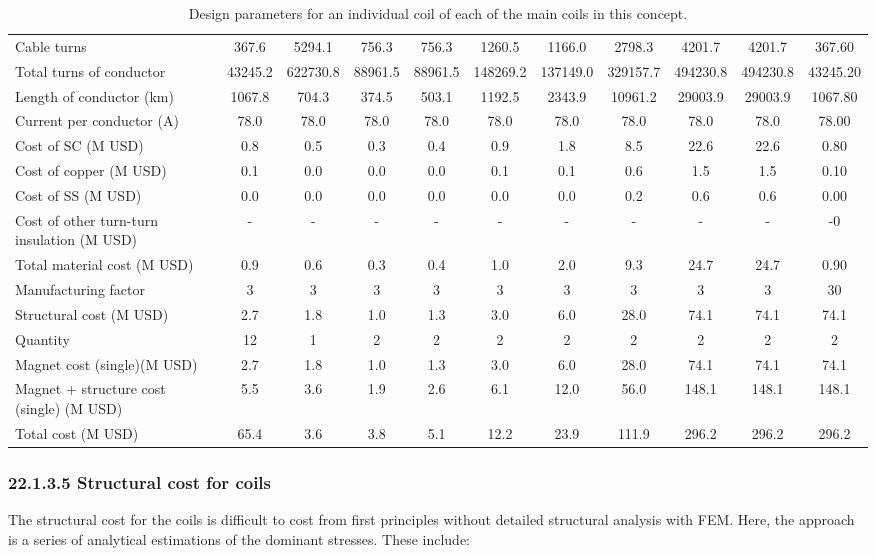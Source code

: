 \begin{table}[h]
{\begin{tabular}{lcccccccccc}
Cable turns & 367.6 & 5294.1 & 756.3 & 756.3 & 1260.5 & 1166.0 & 2798.3 & 4201.7 & 4201.7 & 367.60 \\
Total turns of conductor & 43245.2 & 622730.8 & 88961.5 & 88961.5 & 148269.2 & 137149.0 & 329157.7 & 494230.8 & 494230.8 & 43245.20 \\
Length of conductor (km) & 1067.8 & 704.3 & 374.5 & 503.1 & 1192.5 & 2343.9 & 10961.2 & 29003.9 & 29003.9 & 1067.80 \\
Current per conductor (A) & 78.0 & 78.0 & 78.0 & 78.0 & 78.0 & 78.0 & 78.0 & 78.0 & 78.0 & 78.00 \\
\hline
Cost of SC (M USD) & 0.8 & 0.5 & 0.3 & 0.4 & 0.9 & 1.8 & 8.5 & 22.6 & 22.6 & 0.80 \\
Cost of copper (M USD) & 0.1 & 0.0 & 0.0 & 0.0 & 0.1 & 0.1 & 0.6 & 1.5 & 1.5 & 0.10 \\
Cost of SS (M USD) & 0.0 & 0.0 & 0.0 & 0.0 & 0.0 & 0.0 & 0.2 & 0.6 & 0.6 & 0.00 \\
Cost of other turn-turn insulation (M USD) & - & - & - & - & - & - & - & - & - & -0 \\
Total material cost (M USD) & 0.9 & 0.6 & 0.3 & 0.4 & 1.0 & 2.0 & 9.3 & 24.7 & 24.7 & 0.90 \\
Manufacturing factor & 3 & 3 & 3 & 3 & 3 & 3 & 3 & 3 & 3 & 30 \\
Structural cost (M USD) & 2.7 & 1.8 & 1.0 & 1.3 & 3.0 & 6.0 & 28.0 & 74.1 & 74.1 & 74.1 \\
Quantity & 12 & 1 & 2 & 2 & 2 & 2 & 2 & 2 & 2 & 2 \\
Magnet cost (single)(M USD) & 2.7 & 1.8 & 1.0 & 1.3 & 3.0 & 6.0 & 28.0 & 74.1 & 74.1 & 74.1 \\
Magnet + structure cost (single) (M USD) & 5.5 & 3.6 & 1.9 & 2.6 & 6.1 & 12.0 & 56.0 & 148.1 & 148.1 & 148.1 \\
\hline
Total cost (M USD) & 65.4 & 3.6 & 3.8 & 5.1 & 12.2 & 23.9 & 111.9 & 296.2 & 296.2 & 296.2 \\
\hline
\end{tabular}}
\caption{Design parameters for an individual coil of each of the main coils in this concept.}
\label{your-table-label}
\end{table}


\subsubsection*{22.1.3.5 Structural cost for coils}

The structural cost for the coils is difficult to cost from first principles without detailed structural analysis with FEM. Here, the approach is a series of analytical estimations of the dominant stresses. These include:

